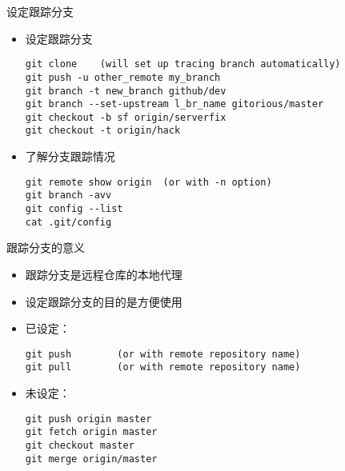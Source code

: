 \begin{frame}[<+->][fragile]{设定跟踪分支}
    \begin{itemize}
        \item 设定跟踪分支

        \begin{Verbatim}[frame=single,commandchars=\\\{\}]
git clone    (will set up tracing branch automatically)
git push -u other_remote my_branch
git branch -t new_branch github/dev
git branch --set-upstream l_br_name gitorious/master
git checkout -b sf origin/serverfix
git checkout -t origin/hack
        \end{Verbatim}
        \item 了解分支跟踪情况

        \begin{Verbatim}[frame=single,commandchars=\\\{\}]
git remote show origin  (or with -n option)
git branch -avv
git config --list
cat .git/config
        \end{Verbatim}
    \end{itemize}
\end{frame}

\begin{frame}[<+->][fragile]{跟踪分支的意义}
    \begin{itemize}
        \item 跟踪分支是远程仓库的本地代理
        \item 设定跟踪分支的目的是方便使用
        \item 已设定：

        \begin{Verbatim}[frame=single,commandchars=\\\{\}]
git push        (or with remote repository name)
git pull        (or with remote repository name)
        \end{Verbatim}
        \item 未设定：

        \begin{Verbatim}[frame=single,commandchars=\\\{\}]
git push origin master
git fetch origin master
git checkout master
git merge origin/master
        \end{Verbatim}
    \end{itemize}
\end{frame}

